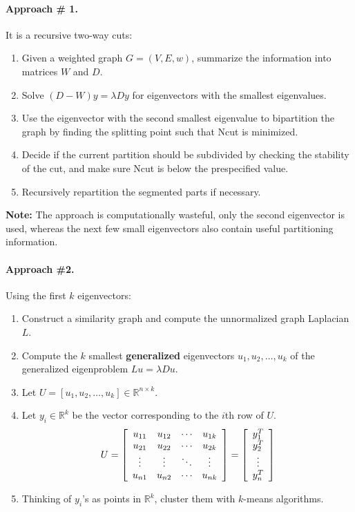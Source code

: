 \paragraph*{Approach \# 1.} It is a recursive two-way cuts:
\begin{enumerate}
	\item Given a weighted graph $G=(V,E,w)$, summarize the information into matrices $W$ and $D$.
	\item Solve $(D-W)y = \lambda Dy$ for eigenvectors with the smallest eigenvalues.
	\item Use the eigenvector with the second smallest eigenvalue to bipartition the graph by finding the splitting point such that Ncut is minimized.
	\item Decide if the current partition should be subdivided by checking the stability of the cut, and make sure Ncut is below the prespecified value.
	\item Recursively repartition the segmented parts if necessary.
\end{enumerate}
\textbf{Note:} The approach is computationally wasteful, only the second eigenvector is used, whereas the next few small eigenvectors also contain useful partitioning information.

\paragraph*{Approach \#2.} Using the first $k$ eigenvectors:
\begin{enumerate}
	\item Construct a similarity graph and compute the unnormalized graph Laplacian $L$.
	\item Compute the $k$ smallest \textbf{generalized} eigenvectors $u _ { 1 } , u _ { 2 } , \dots , u _ { k }$ of the generalized eigenproblem $L u = \lambda D u$.
	\item Let $U = \left[ u_1, u_{ 2 }, \dots, u_{ k } \right] \in \mathbb { R } ^ { n \times k }$.
	\item Let $y_i \in \mathbb{ R }^k$ be the vector corresponding to the $i$th row of $U$.
	$$U = \left[ \begin{array} { c c c c } { u _ { 11 } } & { u _ { 12 } } & { \cdots } & { u _ { 1 k } } \\ { u _ { 21 } } & { u _ { 22 } } & { \cdots } & { u _ { 2 k } } \\ { \vdots } & { \vdots } & { \ddots } & { \vdots } \\ { u _ { n 1 } } & { u _ { n 2 } } & { \cdots } & { u _ { n k } } \end{array} \right] = \left[ \begin{array} { c } { y _ { 1 } ^ { T } } \\ { y _ { 2 } ^ { T } } \\ { \vdots } \\ { y _ { n } ^ { T } } \end{array} \right]$$
	\item Thinking of $y_i$'s as points in $\mathbb{ R }^k$, cluster them with $k$-means algorithms.
\end{enumerate}

